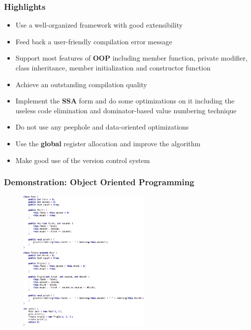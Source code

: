 \documentclass{beamer}
\begin{document}
	\begin{frame}
		\frametitle{Highlights}
		\begin{itemize}
			\item Use a well-organized framework with good extensibility
			\item Feed back a user-friendly compilation error message
			\item Support most features of \textbf{OOP} including member function, private modifier, class inheritance, member initialization and constructor function
			\item<0-0> Achieve an outstanding compilation quality
			\item<0-0> Implement the \textbf{SSA} form and do some optimizations on it including the useless code elimination and dominator-based value numbering technique
			\item<0-0> Do not use any peephole and data-oriented optimizations
			\item<0-0> Use the \textbf{global} register allocation and improve the algorithm
			\item<0-0> Make good use of the version control system
		\end{itemize}
	\end{frame}

	\begin{frame}
		\frametitle{Demonstration: Object Oriented Programming}
		\begin{figure}[!htp]
			\includegraphics[height=7cm]{image/object-oriented-programming}
		\end{figure}
	\end{frame}
	
\end{document}
